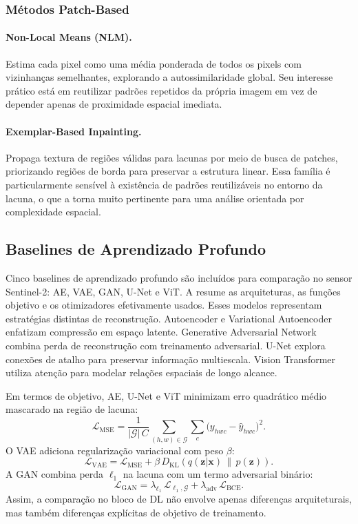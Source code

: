 \subsubsection{Métodos Patch-Based}

\paragraph{Non-Local Means (NLM).}
Estima cada pixel como uma média ponderada de todos os pixels com vizinhanças semelhantes, explorando a autossimilaridade global.
Seu interesse prático está em reutilizar padrões repetidos da própria imagem em vez de depender apenas de proximidade espacial imediata.

\paragraph{Exemplar-Based Inpainting.}
Propaga textura de regiões válidas para lacunas por meio de busca de patches, priorizando regiões de borda para preservar a estrutura linear.
Essa família é particularmente sensível à existência de padrões reutilizáveis no entorno da lacuna, o que a torna muito pertinente para uma análise orientada por complexidade espacial.

\subsection{Baselines de Aprendizado Profundo}
\label{sec:dl-models}

Cinco baselines de aprendizado profundo são incluídos para comparação no sensor Sentinel-2: \gls{AE}, \gls{VAE}, \gls{GAN}, U-Net e \gls{ViT}.
A  resume as arquiteturas, as funções objetivo e os otimizadores efetivamente usados.
Esses modelos representam estratégias distintas de reconstrução.
Autoencoder e Variational Autoencoder enfatizam compressão em espaço latente.
Generative Adversarial Network combina perda de reconstrução com treinamento adversarial.
U-Net explora conexões de atalho para preservar informação multiescala.
Vision Transformer utiliza atenção para modelar relações espaciais de longo alcance.

Em termos de objetivo, \gls{AE}, U-Net e \gls{ViT} minimizam erro quadrático médio mascarado na região de lacuna:
\[
  \mathcal{L}_{\mathrm{MSE}} = \frac{1}{|\mathcal{G}|\,C}
  \sum_{(h,w)\in\mathcal{G}} \sum_c
  \bigl(y_{hwc} - \hat{y}_{hwc}\bigr)^2.
\]
O \gls{VAE} adiciona regularização variacional com peso $\beta$:
\[
  \mathcal{L}_{\mathrm{VAE}} = \mathcal{L}_{\mathrm{MSE}} +
  \beta\, D_{\mathrm{KL}}\!\left(q(\mathbf{z}|\mathbf{x})\,\|\,p(\mathbf{z})\right).
\]
A \gls{GAN} combina perda $\ell_1$ na lacuna com um termo adversarial binário:
\[
  \mathcal{L}_{\mathrm{GAN}} =
  \lambda_{\ell_1}\,\mathcal{L}_{\ell_1,\mathcal{G}} +
  \lambda_{\mathrm{adv}}\,\mathcal{L}_{\mathrm{BCE}}.
\]
Assim, a comparação no bloco de \gls{DL} não envolve apenas diferenças arquiteturais, mas também diferenças explícitas de objetivo de treinamento.

